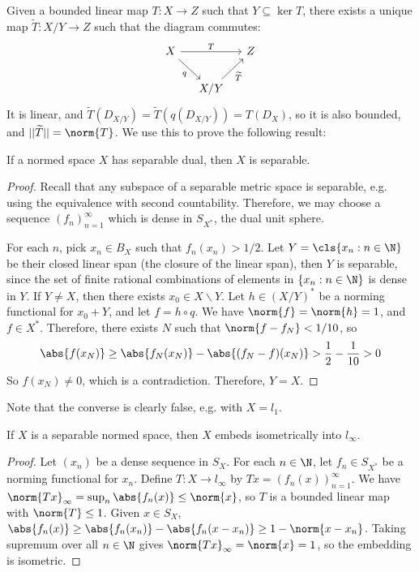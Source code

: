 \documentclass[a4paper]{article}
\begin{document}
Given a bounded linear map $T:X\to Z$ such that $Y\subseteq\ker T$, there exists a unique map $\widetilde{T}:X/Y\to Z$ such that the diagram commutes:
\[
  \begin{tikzcd}[column sep=small]
    X \arrow[rr, "T"] \arrow[dr, "q"'] & & Z\\
    & X/Y \arrow[ur, "\widetilde{T}"'] &
  \end{tikzcd}
\]
It is linear, and $\widetilde{T}(D_{X/Y})=\widetilde{T}(q(D_{X/Y}))=T(D_X)$, so it is also bounded, and $||\widetilde{T}||=\norm{T}$. We use this to prove the following result:

\begin{nthm}\label{thm:DualSeparable}
  If a normed space $X$ has separable dual, then $X$ is separable.
\end{nthm}

\begin{proof}
  Recall that any subspace of a separable metric space is separable, e.g. using the equivalence with second countability. Therefore, we may choose a sequence $(f_n)_{n=1}^\infty$ which is dense in $S_{X^*}$, the dual unit sphere.

  For each $n$, pick $x_n\in B_X$ such that $f_n(x_n)>1/2$. Let $Y=\cls\{x_n:n\in\N\}$ be their closed linear span (the closure of the linear span), then $Y$ is separable, since the set of finite rational combinations of elements in $\{x_n:n\in\N\}$ is dense in $Y$. If $Y\not= X$, then there exists $x_0\in X\backslash Y$. Let $h\in(X/Y)^*$ be a norming functional for $x_0+Y$, and let $f=h\circ q$. We have $\norm{f}=\norm{h}=1$, and $f\in X^*$. Therefore, there exists $N$ such that $\norm{f-f_N}<1/10$, so
  \[
    \abs{f(x_N)}\geq\abs{f_N(x_N)}-\abs{(f_N-f)(x_N)}>\frac{1}{2}-\frac{1}{10}>0
  \]
So $f(x_N)\not= 0$, which is a contradiction. Therefore, $Y=X$.
\end{proof}

Note that the converse is clearly false, e.g. with $X=l_1$.

\begin{nthm}\label{thm:l_infinity}
  If $X$ is a separable normed space, then $X$ embeds isometrically into $l_\infty$.
\end{nthm}

\begin{proof}
  Let $(x_n)$ be a dense sequence in $S_X$. For each $n\in\N$, let $f_n\in S_{X^*}$ be a norming functional for $x_n$. Define $T:X\to l_\infty$ by $Tx=(f_n(x))_{n=1}^\infty$. We have $\norm{Tx}_\infty=\sup_n\abs{f_n(x)}\leq\norm{x}$, so $T$ is a bounded linear map with $\norm{T}\leq 1$. Given $x\in S_X$, $\abs{f_n(x)}\geq\abs{f_n(x_n)}-\abs{f_n(x-x_n)}\geq 1-\norm{x-x_n}$. Taking supremum over all $n\in\N$ gives $\norm{Tx}_\infty=\norm{x}=1$, so the embedding is isometric.
\end{proof}
\end{document}

